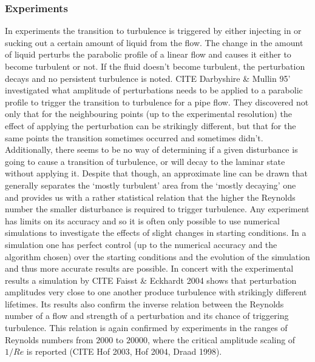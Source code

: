 \documentclass[11pt,a4paper]{article}
\begin{document}
\subsubsection{Experiments}
In experiments the transition to turbulence is triggered by either injecting in or sucking out a certain amount of liquid from the flow.
The change in the amount of liquid perturbs the parabolic profile of a linear flow and causes it either to become turbulent or not.
If the fluid doesn't become turbulent, the perturbation decays and no persistent turbulence is noted.
CITE Darbyshire \& Mullin 95' investigated what amplitude of perturbations needs to be applied to a parabolic profile to trigger the transition to turbulence for a pipe flow.
They discovered not only that for the neighbouring points (up to the experimental resolution) the effect of applying the perturbation can be strikingly different, but that for the same points the transition sometimes occurred and sometimes didn't.
Additionally, there seems to be no way of determining if a given disturbance is going to cause a transition of turbulence, or will decay to the laminar state without applying it.
Despite that though, an approximate line can be drawn that generally separates the `mostly turbulent' area from the `mostly decaying' one and provides us with a rather statistical relation that the higher the Reynolds number the smaller disturbance is required to trigger turbulence.
Any experiment has limits on its accuracy and so it is often only possible to use numerical simulations to investigate the effects of slight changes in starting conditions.
In a simulation one has perfect control (up to the numerical accuracy and the algorithm chosen) over the starting conditions and the evolution of the simulation and thus more accurate results are possible.
In concert with the experimental results a simulation by CITE Faisst \& Eckhardt 2004 shows that perturbation amplitudes very close to one another produce turbulence with strikingly different lifetimes.
Its results also confirm the inverse relation between the Reynolds number of a flow and strength of a perturbation and its chance of triggering turbulence.
This relation is again confirmed by experiments in the ranges of Reynolds numbers from \(2000\) to \(20000\), where the critical amplitude scaling of \(1 / Re\) is reported (CITE Hof 2003, Hof 2004, Draad 1998).
\end{document}
